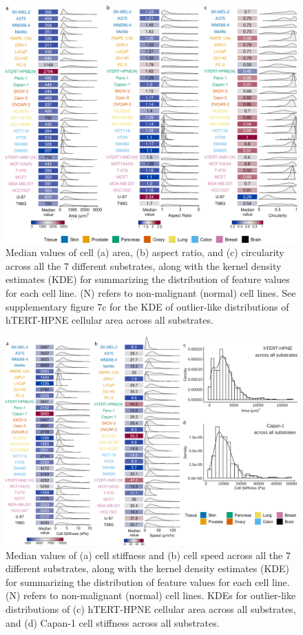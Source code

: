 \documentclass[11pt,letterpaper,english,oneside]{article} %
\begin{document}
\begin{figure}[H]
    \centering
    \includegraphics{../Figures/Supplementary_Figure6/supplementary_figure6.png}
    \caption{Median values of cell (a) area, (b) aspect ratio, and (c) circularity across all the 7 different substrates, along with the kernel density estimates (KDE) for summarizing the distribution of feature values for each cell line. (N) refers to non-malignant (normal) cell lines.
    See supplementary figure 7c for the KDE of outlier-like distributions of hTERT-HPNE cellular area across all substrates.}
    \label{fig:fig6}
\end{figure}

\begin{figure}[H]
    \hspace*{-0.8cm}
    \centering
    \includegraphics{../Figures/Supplementary_Figure7/supplementary_figure7.png}
    \caption{Median values of (a) cell stiffness and (b) cell speed across all the 7 different substrates, along with the kernel density estimates (KDE) for summarizing the distribution of feature values for each cell line. (N) refers to non-malignant (normal) cell lines.
    KDEs for outlier-like distributions of (c) hTERT-HPNE cellular area across all substrates, and (d) Capan-1 cell stiffness across all substrates.}
    \label{fig:fig7}
\end{figure}
\end{document}
